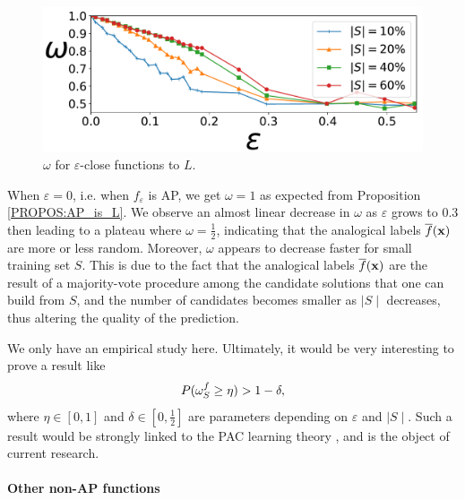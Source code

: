\begin{figure}
\begin{center}
\includegraphics[scale=0.6]{figures/omega_vs_eps_dim8_nexp50_std_nEss8.pdf}
  \caption{$\omega$ for $\varepsilon$-close functions to $L$.}
\label{omega_vs_eps}
\end{center}
\end{figure}

When $\varepsilon = 0$, i.e. when $f_\varepsilon$ is AP, we get $\omega = 1$ as expected from
Proposition \ref{PROPOS:AP_is_L}. We observe an almost linear decrease in $\omega$ as
$\varepsilon$ grows to $0.3$ then leading to a plateau where $\omega =
\frac{1}{2}$, indicating that the analogical labels $\overline{f}(\mathbf{x})$ are
more or less random. Moreover, $\omega$ appears to decrease faster for small
training set $S$. This is due to the fact that the analogical labels
$\overline{f}(\mathbf{x})$ are the result of a majority-vote procedure among the
candidate solutions that one can build from $S$, and the number of candidates
becomes smaller as $\mid S\mid$ decreases, thus altering the quality of the
prediction.

We only have an empirical study here. Ultimately, it would be very interesting
to prove a result like
$$P(\omega_{S}^{f} \geq \eta) > 1 - \delta,$$
where $\eta \in [0, 1]$ and $\delta \in [0, \frac{1}{2}]$ are parameters 
depending on $\varepsilon$ and $\mid S \mid$. Such a result would be strongly
linked to the PAC learning theory \cite{Val72}, and is the object of current
research.

\paragraph{Other non-AP functions\\}


